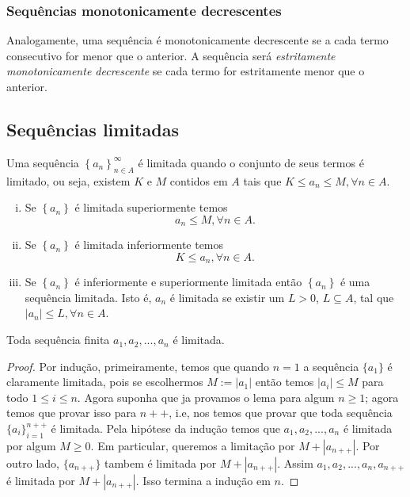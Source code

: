             \subsubsection{Sequências monotonicamente decrescentes}
               Analogamente, uma sequência é monotonicamente decrescente 
               se a cada termo consecutivo for menor que o anterior. 
               A sequência será \emph{estritamente monotonicamente 
               decrescente} se cada termo for estritamente menor que o anterior.
      
   \subsection{Sequências limitadas}
      \begin{definition}
         Uma sequência $\left\{a_{n}\right\}^{\infty}_{n \in A}$
         é limitada quando o conjunto de seus termos é limitado, 
         ou seja, existem $K$ e $M$ contidos em $A$ tais que 
         $K \leq a_{n} \leq M, \forall n \in A$.
         \begin{enumerate}[i.]
            \item Se $\left\{a_{n}\right\}$ é limitada superiormente 
               temos $$a_{n} \leq M,\forall n \in A.$$
            \item Se $\left\{a_{n}\right\}$ é limitada inferiormente 
               temos $$K \leq a_{n}, \forall n \in A.$$
            \item Se $\left\{a_{n}\right\}$ é inferiormente e superiormente
               limitada então $\left\{a_{n}\right\}$ é uma sequência limitada.
               Isto é, ${a_{n}}$ é limitada se existir um 
               $L > 0$, $L \subseteq A$, tal que 
               $|a_{n}| \leq L, \forall n \in A$.
         \end{enumerate}
      \end{definition}
      \begin{lemma}
         Toda sequência finita $a_{1},a_{2},...,a_{n}$ é limitada.
         \begin{proof}
            Por indução, primeiramente, temos que quando $n=1$ a 
            sequência $\{a_{1}\}$ é claramente limitada, pois se 
            escolhermos $M := |a_{1}|$ então temos 
            $|a_{i}| \leq M$ para todo $1 \leq i \leq n$. Agora 
            suponha que ja provamos o lema para algum $n \geq 1$; 
            agora temos que provar isso para $n++$, i.e, nos temos 
            que provar que toda sequência $\{a_{i}\}^{n++}_{i=1}$ 
            é limitada. Pela hipótese da indução temos que 
            $a_{1},a_{2}, ...,a_{n}$ é limitada por algum $M \geq 0$.
            Em particular, queremos a limitação por 
            $M + |a_{n++}|$. Por outro lado, $\{a_{n++}\}$ 
            tambem é limitada por $M + |a_{n++}|$.
            Assim $a_{1},a_{2},...,a_{n},a_{n++}$ é limitada 
            por $M + |a_{n++}|$. Isso termina a indução em $n$.
         \end{proof}
      \end{lemma}
